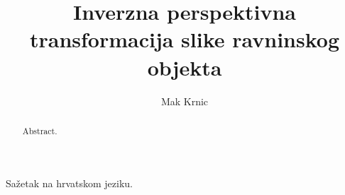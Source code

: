 \documentclass[times, utf8, zavrsni, numeric]{fer}
\begin{document}

\title{Inverzna perspektivna transformacija slike ravninskog objekta}

\author{Mak Krnic}

\maketitle

\izvornik

\zahvala{}

\tableofcontents












\begin{sazetak}
Sažetak na hrvatskom jeziku.

\end{sazetak}

\begin{abstract}
Abstract.

\end{abstract}
\end{document}
